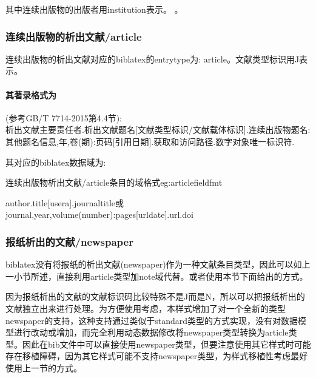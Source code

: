 其中连续出版物的出版者用institution表示。
。

\subsubsection{连续出版物的析出文献/article}
\begin{refentry}{}{}%
连续出版物的析出文献对应的biblatex的entrytype为: article。文献类型标识用J表示。

\paragraph{其著录格式为}(参考GB/T 7714-2015第4.4节):\\
析出文献主要责任者.析出文献题名[文献类型标识/文献载体标识].连续出版物题名:其他题名信息,年,卷(期):页码[引用日期].获取和访问路径.数字对象唯一标识符.
\end{refentry}

其对应的biblatex数据域为:
\begin{example}{连续出版物析出文献/article条目的域格式}{eg:articlefieldfmt}
\begin{texlist}
author.title[usera].journaltitle或journal,year,volume(number):pages[urldate].url.doi
\end{texlist}
\end{example}


\subsubsection{报纸析出的文献/newspaper}\label{sec:standard}
biblatex没有将报纸的析出文献(newspaper)作为一种文献条目类型，因此可以如上一小节所述，直接利用article类型加note域代替。或者使用本节下面给出的方式。

因为报纸析出的文献的文献标识码比较特殊不是J而是N，所以可以把报纸析出的文献独立出来进行处理。为方便使用考虑，本样式增加了对一个全新的类型newspaper的支持，这种支持通过类似于standard类型的方式实现，没有对数据模型进行改动或增加，而完全利用动态数据修改将newspaper类型转换为article类型。因此在bib文件中可以直接使用newspaper类型，但要注意使用其它样式时可能存在移植障碍，因为其它样式可能不支持newspaper类型，为样式移植性考虑最好使用上一节的方式。


